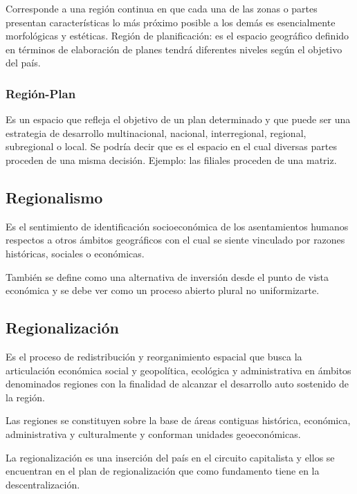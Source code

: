 \documentclass[
  a4paper,
]{article}
\begin{document}
Corresponde a una región continua en que cada una de las zonas o partes
presentan características lo más próximo posible a los demás es
esencialmente morfológicas y estéticas. Región de planificación: es el
espacio geográfico definido en términos de elaboración de planes tendrá
diferentes niveles según el objetivo del país.

\subsubsection{Región-Plan}\label{regiuxf3n-plan}

Es un espacio que refleja el objetivo de un plan determinado y que puede
ser una estrategia de desarrollo multinacional, nacional, interregional,
regional, subregional o local. Se podría decir que es el espacio en el
cual diversas partes proceden de una misma decisión. Ejemplo: las
filiales proceden de una matriz.

\subsection{Regionalismo}\label{regionalismo}

Es el sentimiento de identificación socioeconómica de los asentamientos
humanos respectos a otros ámbitos geográficos con el cual se siente
vinculado por razones históricas, sociales o económicas.

También se define como una alternativa de inversión desde el punto de
vista económica y se debe ver como un proceso abierto plural no
uniformizarte.

\subsection{Regionalización}\label{regionalizaciuxf3n}

Es el proceso de redistribución y reorganimiento espacial que busca la
articulación económica social y geopolítica, ecológica y administrativa
en ámbitos denominados regiones con la finalidad de alcanzar el
desarrollo auto sostenido de la región.

Las regiones se constituyen sobre la base de áreas contiguas histórica,
económica, administrativa y culturalmente y conforman unidades
geoeconómicas.

La regionalización es una inserción del país en el circuito capitalista
y ellos se encuentran en el plan de regionalización que como fundamento
tiene en la descentralización.
\end{document}
